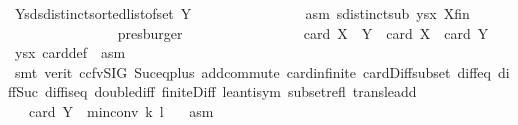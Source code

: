 \begin{isabellebody}
\ Y{\isacharunderscore}{\kern0pt}sd{\isacharcolon}{\kern0pt}{\isachardoublequoteopen}sdistinct{\isacharparenleft}{\kern0pt}sorted{\isacharunderscore}{\kern0pt}list{\isacharunderscore}{\kern0pt}of{\isacharunderscore}{\kern0pt}set\ Y{\isacharparenright}{\kern0pt}{\isachardoublequoteclose}\isanewline
\ \ \ \ \ \ \ \ \ \ \ \ \ \ \isamarkupfalse%
\ asm{\isacharparenleft}{\kern0pt}{}{\isacharparenright}{\kern0pt}\ sdistinct{\isacharunderscore}{\kern0pt}sub\ ysx\ X{\isacharunderscore}{\kern0pt}fin\isanewline
\ \ \ \ \ \ \ \ \ \ \ \ \ \ \isamarkupfalse%
\ presburger\isanewline
\isanewline
\ \ \ \ \ \ \ \ \ \ \ \ \isamarkupfalse%
\ \ \ \ {\isachardoublequoteopen}card\ {\isacharparenleft}{\kern0pt}X\ {\isacharminus}{\kern0pt}\ Y{\isacharparenright}{\kern0pt}\ {\isacharequal}{\kern0pt}\ card\ X\ {\isacharminus}{\kern0pt}\ card\ Y{\isachardoublequoteclose}\ \isamarkupfalse%
\ ysx\ card{\isacharunderscore}{\kern0pt}def\ {}\ asm{\isacharparenleft}{\kern0pt}{}{\isacharparenright}{\kern0pt}\isanewline
\ \ \ \ \ \ \ \ \ \ \ \ \ \ \isamarkupfalse%
\ {\isacharparenleft}{\kern0pt}smt\ {\isacharparenleft}{\kern0pt}verit{\isacharcomma}{\kern0pt}\ ccfv{\isacharunderscore}{\kern0pt}SIG{\isacharparenright}{\kern0pt}\ Suc{\isacharunderscore}{\kern0pt}eq{\isacharunderscore}{\kern0pt}plus{}\ add{\isachardot}{\kern0pt}commute\ card{\isachardot}{\kern0pt}infinite\ card{\isacharunderscore}{\kern0pt}Diff{\isacharunderscore}{\kern0pt}subset\ diff{\isacharunderscore}{\kern0pt}{}{\isacharunderscore}{\kern0pt}eq{\isacharunderscore}{\kern0pt}{}\ diff{\isacharunderscore}{\kern0pt}Suc{\isacharunderscore}{\kern0pt}{}\ diff{\isacharunderscore}{\kern0pt}is{\isacharunderscore}{\kern0pt}{}{\isacharunderscore}{\kern0pt}eq\ double{\isacharunderscore}{\kern0pt}diff\ finite{\isacharunderscore}{\kern0pt}Diff\ le{\isacharunderscore}{\kern0pt}antisym\ subset{\isacharunderscore}{\kern0pt}refl\ trans{\isacharunderscore}{\kern0pt}le{\isacharunderscore}{\kern0pt}add{}{\isacharparenright}{\kern0pt}\isanewline
\ \ \ \ \ \ \ \ \ \ \ \ \isamarkupfalse%
\ \ \ {\isachardoublequoteopen}card\ Y\ {\isasymge}\ min{\isacharunderscore}{\kern0pt}conv\ {\isacharparenleft}{\kern0pt}k{\isacharminus}{\kern0pt}{}{\isacharparenright}{\kern0pt}\ l{\isachardoublequoteclose}\ \isamarkupfalse%
\ {}\ asm{\isacharparenleft}{\kern0pt}{}{\isacharparenright}{\kern0pt}\ \isamarkupfalse%

\end{isabellebody}

